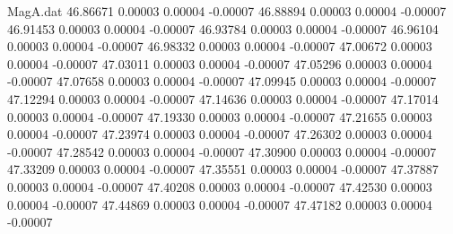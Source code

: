 \begin{filecontents}{MagA.dat}
  46.86671    0.00003    0.00004   -0.00007
  46.88894    0.00003    0.00004   -0.00007
  46.91453    0.00003    0.00004   -0.00007
  46.93784    0.00003    0.00004   -0.00007
  46.96104    0.00003    0.00004   -0.00007
  46.98332    0.00003    0.00004   -0.00007
  47.00672    0.00003    0.00004   -0.00007
  47.03011    0.00003    0.00004   -0.00007
  47.05296    0.00003    0.00004   -0.00007
  47.07658    0.00003    0.00004   -0.00007
  47.09945    0.00003    0.00004   -0.00007
  47.12294    0.00003    0.00004   -0.00007
  47.14636    0.00003    0.00004   -0.00007
  47.17014    0.00003    0.00004   -0.00007
  47.19330    0.00003    0.00004   -0.00007
  47.21655    0.00003    0.00004   -0.00007
  47.23974    0.00003    0.00004   -0.00007
  47.26302    0.00003    0.00004   -0.00007
  47.28542    0.00003    0.00004   -0.00007
  47.30900    0.00003    0.00004   -0.00007
  47.33209    0.00003    0.00004   -0.00007
  47.35551    0.00003    0.00004   -0.00007
  47.37887    0.00003    0.00004   -0.00007
  47.40208    0.00003    0.00004   -0.00007
  47.42530    0.00003    0.00004   -0.00007
  47.44869    0.00003    0.00004   -0.00007
  47.47182    0.00003    0.00004   -0.00007
\end{filecontents}

